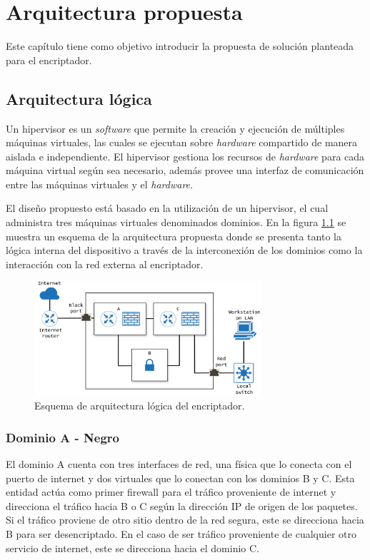 \chapter{Arquitectura propuesta}

Este capítulo tiene como objetivo introducir la propuesta de solución planteada para el encriptador.

\section{Arquitectura lógica}

Un hipervisor es un \textit{software} que permite la creación y ejecución de múltiples máquinas virtuales, las cuales se ejecutan sobre \textit{hardware} compartido de manera aislada e independiente. El hipervisor gestiona los recursos de \textit{hardware} para cada máquina virtual según sea necesario, además provee una interfaz de comunicación entre las máquinas virtuales y el \textit{hardware}.

El diseño propuesto está basado en la utilización de un hipervisor, el cual administra tres máquinas virtuales denominados dominios. En la figura \ref{fig:arquitectura_logica} se muestra un esquema de la arquitectura propuesta donde se presenta tanto la lógica interna del dispositivo a través de la interconexión de los dominios como la interacción con la red externa al encriptador.

\begin{figure}[h!]
    \centering
    \includegraphics[width=0.75\textwidth]{../figs/2_arquitectura_logica.png}
    \caption{Esquema de arquitectura lógica del encriptador.}
    \label{fig:arquitectura_logica}
\end{figure}


\subsection{Dominio A - Negro}
El dominio A cuenta con tres interfaces de red, una física que lo conecta con el puerto de internet y dos virtuales que lo conectan con los dominios B y C.
Esta entidad actúa como primer firewall para el tráfico proveniente de internet y direcciona el tráfico hacia B o C según la dirección IP de origen de los paquetes. Si el tráfico proviene de otro sitio dentro de la red segura, este se direcciona hacia B para ser desencriptado. En el caso de ser tráfico proveniente de cualquier otro servicio de internet, este se direcciona hacia el dominio C.

